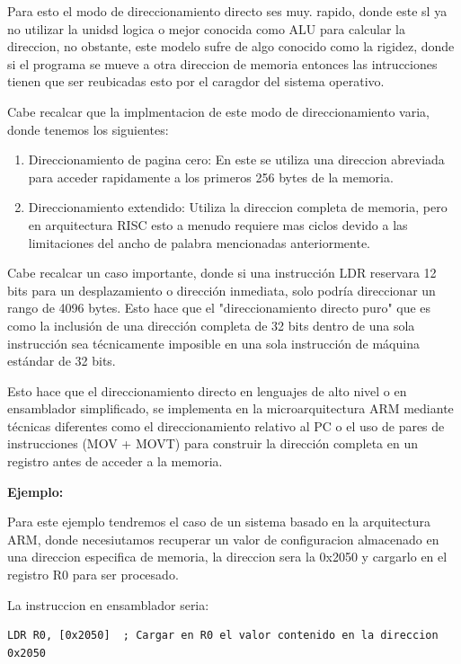 \documentclass[letterpaper,12pt]{article}
\begin{document}
    Para esto el modo de direccionamiento directo ses muy. rapido, donde este sl ya no utilizar la unidsd logica o mejor conocida como ALU para calcular la direccion, no obstante, este modelo sufre de algo conocido como la rigidez, donde si el programa se mueve a otra direccion de memoria entonces las intrucciones tienen que ser reubicadas esto por el caragdor del sistema operativo.

    Cabe recalcar que la implmentacion de este modo de direccionamiento varia, donde tenemos los siguientes:
    \begin{enumerate}
        \item Direccionamiento de pagina cero: En este se utiliza una direccion abreviada para acceder rapidamente a los primeros 256 bytes de la memoria.  
        \item Direccionamiento extendido: Utiliza la direccion completa de memoria, pero en arquitectura RISC esto a menudo requiere mas ciclos devido a las limitaciones del ancho de palabra mencionadas anteriormente.   
    \end{enumerate}

    Cabe recalcar un caso importante, donde si una instrucción LDR reservara 12 bits para un desplazamiento o dirección inmediata, solo podría direccionar un rango de 4096 bytes. Esto hace que el "direccionamiento directo puro" que es como la inclusión de una dirección completa de 32 bits dentro de una sola instrucción sea técnicamente imposible en una sola instrucción de máquina estándar de 32 bits.

    Esto hace que el direccionamiento directo en lenguajes de alto nivel o en ensamblador simplificado, se implementa en la microarquitectura ARM mediante técnicas diferentes como el direccionamiento relativo al PC o el uso de pares de instrucciones (MOV + MOVT) para construir la dirección completa en un registro antes de acceder a la memoria.
    
    \newpage
    
    \textbf{Ejemplo:}

    Para este ejemplo tendremos el caso de un sistema basado en la arquitectura ARM, donde necesiutamos recuperar un valor de configuracion almacenado en una direccion especifica de memoria, la direccion sera la 0x2050 y cargarlo en el registro R0 para ser procesado.
    
    La instruccion en ensamblador seria:


    \begin{lstlisting}[language={[x86masm]Assembler}, caption={Ejemplo de direccionamiento directo}]
        LDR R0, [0x2050]  ; Cargar en R0 el valor contenido en la direccion 0x2050
    \end{lstlisting}
    
\end{document}
